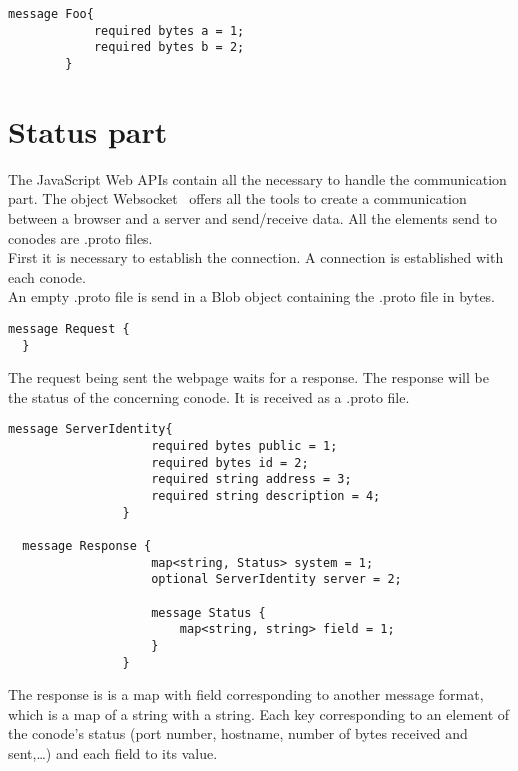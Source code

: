 \documentclass[11pt, a4paper, twoside, openright]{book} %
\begin{document}
\begin{lstlisting}[caption={example of .proto file}, captionpos=b]
 message Foo{
            required bytes a = 1;
            required bytes b = 2;
        }
\end{lstlisting}

\section{Status part}
The JavaScript Web APIs contain all the necessary to handle the communication
part. The object Websocket~\cite{websocketPage} offers all the tools to create a
communication between a browser and a server and send/receive data. All the elements send to conodes are .proto files.\\
First it is necessary to establish the connection. A connection is established
with each conode.\\
An empty .proto file is send in a Blob object containing the .proto file in bytes.\\

\begin{lstlisting}[caption={empty .proto file}, captionpos=b]
  message Request {
  }
\end{lstlisting}

The request being sent the webpage waits for a response. The response will be the
status of the concerning conode. It is received as a .proto file.

\begin{lstlisting}[caption={response .proto file}, captionpos=b]
  message ServerIdentity{
    				required bytes public = 1;
    				required bytes id = 2;
    				required string address = 3;
    				required string description = 4;
				}

  message Response {
    				map<string, Status> system = 1;
    				optional ServerIdentity server = 2;

				    message Status {
        				map<string, string> field = 1;
    				}
				}
\end{lstlisting}

The response is is a map with field corresponding to another message format, which
is a map of a string with a string. Each key corresponding to an element of the conode's
status (port number, hostname, number of bytes received and sent,\ldots) and each field
to its value.\\
\end{document}
